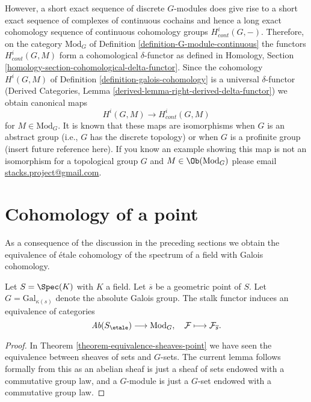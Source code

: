\medskip\noindent
However, a short exact sequence of discrete $G$-modules does give
rise to a short exact sequence of complexes of continuous cochains
and hence a long exact cohomology sequence of continuous
cohomology groups $H^i_{cont}(G, -)$.
Therefore, on the category $\text{Mod}_G$ of
Definition \ref{definition-G-module-continuous} the functors
$H^i_{cont}(G, M)$ form a cohomological $\delta$-functor as defined
in Homology, Section \ref{homology-section-cohomological-delta-functor}.
Since the cohomology $H^i(G, M)$
of Definition \ref{definition-galois-cohomology}
is a universal $\delta$-functor
(Derived Categories, Lemma \ref{derived-lemma-right-derived-delta-functor})
we obtain canonical maps
$$
H^i(G, M) \longrightarrow H^i_{cont}(G, M)
$$
for $M \in \text{Mod}_G$. It is known that these maps are
isomorphisms when $G$ is an abstract group (i.e., $G$ has
the discrete topology) or when $G$ is a profinite group
(insert future reference here).
If you know an example showing this map is not an isomorphism
for a topological group $G$ and $M \in \Ob(\text{Mod}_G)$
please email
\href{mailto:stacks.project@gmail.com}{stacks.project@gmail.com}.




\section{Cohomology of a point}
\label{section-cohomology-point}

\noindent
As a consequence of the discussion in the preceding sections
we obtain the equivalence of \'etale cohomology of the spectrum of a
field with Galois cohomology.

\begin{lemma}
\label{lemma-equivalence-abelian-sheaves-point}
Let $S = \Spec(K)$ with $K$ a field.
Let $\overline{s}$ be a geometric point of $S$.
Let $G = \text{Gal}_{\kappa(s)}$ denote the absolute Galois group.
The stalk functor induces an equivalence of categories
$$
\textit{Ab}(S_\etale) \longrightarrow \text{Mod}_G,
\quad
\mathcal{F} \longmapsto \mathcal{F}_{\overline{s}}.
$$
\end{lemma}

\begin{proof}
In
Theorem \ref{theorem-equivalence-sheaves-point}
we have seen the equivalence between sheaves of sets and $G$-sets.
The current lemma follows formally from this as an abelian sheaf is just
a sheaf of sets endowed with a commutative group law, and a $G$-module
is just a $G$-set endowed with a commutative group law.
\end{proof}

